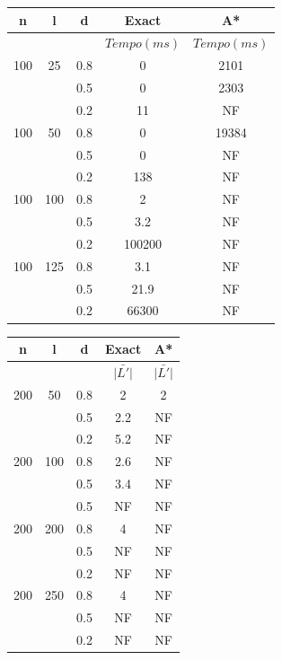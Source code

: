 \documentclass[12pt]{article}
\begin{document}
		\begin{tabular}{c|c|c|c|c} \hline
			n & l & d & Exact & A* \\ \hline
			& & & $Tempo(ms)$ & $Tempo(ms)$\\ \hline
			100 & 25  & 0.8 &  0 & 2101\\
			   &      & 0.5 &  0 & 2303\\
			   &      & 0.2 & 11 & NF\\ \hline
			100 & 50  & 0.8 &  0 & 19384 \\
			   &      & 0.5 &  0 & NF\\
			   &      & 0.2 & 138 & NF\\ \hline
			100 & 100 & 0.8 &  2 & NF\\
			   &      & 0.5 & 3.2 & NF\\
			   &      & 0.2 & 100200 & NF\\ \hline
			100 & 125 & 0.8 & 3.1 & NF\\
			   &      & 0.5 & 21.9 & NF\\
			   &      & 0.2 & 66300 & NF\\ \hline
		\end{tabular}


		
		\vspace{2cm}

		\begin{tabular}{c|c|c|c|c} \hline
			n & l & d & Exact & A* \\ \hline
			& & & $\bar{|L'|}$ & $\bar{|L'|}$ \\ \hline
			200 & 50  & 0.8 & 2 & 2\\
			   &      & 0.5 & 2.2 & NF\\
			   &      & 0.2 & 5.2 & NF\\ \hline
			200 & 100  & 0.8 & 2.6 & NF \\
			   &      & 0.5 & 3.4 & NF\\
			   &      & 0.5 & NF & NF\\ \hline
			200 & 200 & 0.8 &  4 & NF\\
			   &      & 0.5 & NF & NF\\
			   &      & 0.2 & NF & NF\\ \hline
			200 & 250 & 0.8 & 4 & NF\\
			   &      & 0.5 & NF & NF\\
			   &      & 0.2 & NF & NF\\ \hline
		\end{tabular}


		\vspace{2cm}
\end{document}
